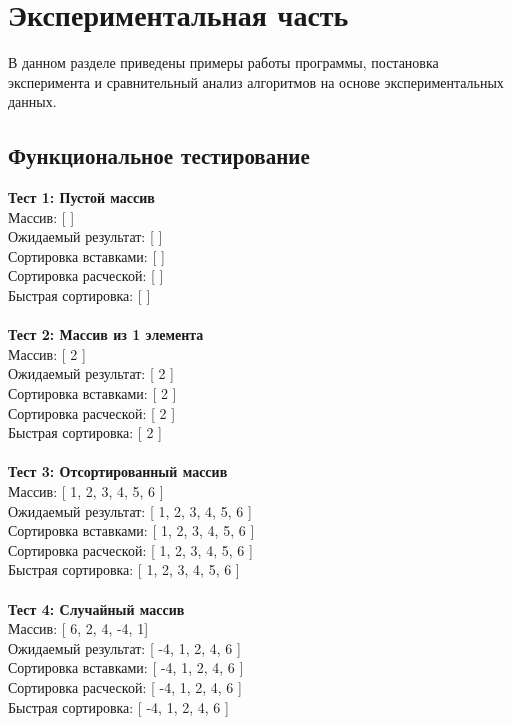 \documentclass[a4paper,12pt]{report}
\begin{document}
\chapter{Экспериментальная часть}
В данном разделе приведены примеры работы программы, постановка эксперимента и сравнительный анализ алгоритмов на основе экспериментальных данных.
\section{Функциональное тестирование}
\hspace{0.6cm}\textbf {Тест 1: Пустой массив}\\
Массив: [ ]\\
Ожидаемый результат: [ ]\\
Сортировка вставками: [ ]\\
Сортировка расческой: [ ]\\
Быстрая сортировка: [ ]\\\\

\textbf {Тест 2: Массив из 1 элемента}\\
Массив: [ 2 ]\\
Ожидаемый результат: [ 2 ]\\
Сортировка вставками: [ 2 ]\\
Сортировка расческой: [ 2 ]\\
Быстрая сортировка: [ 2 ]\\\\

\textbf {Тест 3: Отсортированный массив}\\
Массив: [ 1, 2, 3, 4, 5, 6 ]\\
Ожидаемый результат: [ 1, 2, 3, 4, 5, 6 ]\\
Сортировка вставками: [ 1, 2, 3, 4, 5, 6 ]\\
Сортировка расческой: [ 1, 2, 3, 4, 5, 6 ]\\
Быстрая сортировка: [ 1, 2, 3, 4, 5, 6 ]\\\\

\textbf {Тест 4: Случайный массив}\\
Массив: [ 6, 2, 4, -4, 1]\\
Ожидаемый результат: [ -4, 1, 2, 4, 6 ]\\
Сортировка вставками: [ -4, 1, 2, 4, 6 ]\\
Сортировка расческой: [ -4, 1, 2, 4, 6 ]\\
Быстрая сортировка: [ -4, 1, 2, 4, 6 ]\\\\
\end{document}
